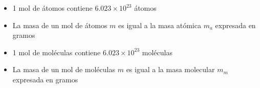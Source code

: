 \begin{warncard}[adjusted title={Consecuencias de la definición de Masa Molar}]
    \begin{itemize}
        \item 1 mol de átomos contiene $6.023 \times 10^{23}$ átomos
        \item La masa de un mol de átomos $m$ es igual a la masa atómica $m_a$ expresada en gramos
        \item 1 mol de moléculas contiene $6.023 \times 10^{23}$ moléculas
        \item La masa de un mol de moléculas $m$ es igual a la masa molecular $m_m$ expresada en gramos
    \end{itemize}
\end{warncard}